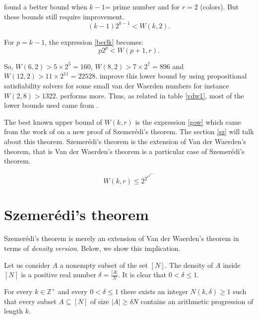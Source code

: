  \cite{brk1968} found a better bound when $k-1$= prime number  and for $r=2$ (colors). But these bounds still  require improvement.
 \begin{equation}
 (k-1)2^{k-1}<W(k,2). \label{berlk}
 \end{equation}

For $p=k-1$, the expression \eqref{berlk} becomes:
 \begin{equation}
 p2^{p}<W(p+1,r). \label{berlk1}
 \end{equation}

So, $W(6,2) >5 \times 2^5=160$, $W(8,2) >7 \times 2^7= 896$ and $W(12,2) >11 \times 2^11= 22528.$
\citep{dransfield2004} improve this lower bound by using propositional satisfiability solvers  for some small van der Waerden numbers for instance $W(2, 8) > 1322$. \cite{rabung2012} performs more. Thus, as related in table \eqref{vdw1}, most of the lower bounds used came from \cite{rabung2012}.

The best known upper bound of $W(k,r)$ is the expression  \eqref{gow} which came from the work of \cite{gowers2001new} on a  new proof of Szemerédi's theorem. The section \eqref{sz} will talk about this theorem. Szemerédi's theorem is the extension of Van der Waerden's theorem, that is Van der Waerden's theorem is a particular case of Szemerédi's theorem.

\begin{equation}
W(k,r) \leq 2^{2^{r^{2^{2^{k+9}}}}}     \label{gow}
\end{equation}



\section{Szemerédi's theorem} \label{sz}

Szemerédi's theorem is merely an extension of Van der Waerden's theorem in terms of \textit{density version}. Below, we show this implication.

Let us consider $A$ a nonempty subset of the set $[N]$. The density of $A$ inside $[N]$ is a positive real number $\delta=\frac{|A|}{N}$. It is clear that $0< \delta \leq 1.$ 

\begin{thm}\citep{Polymath2009new}	For every  $k \in \mathbb{Z}^+$ and every $0< \delta \leq  1$ there exists an integer $N(k,\delta) \geq 1$ such that every subset $A \subseteq [N]$ of size $|A|\geq \delta N$ contains an arithmetic progression of length $k.$  \label{sz1} \end{thm}


